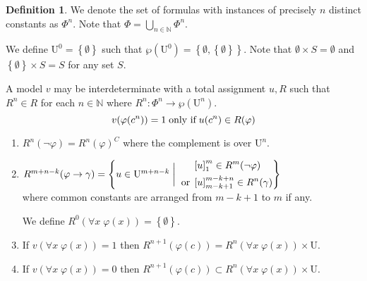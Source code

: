 \documentclass{amsbook}
\newcommand{\setsm}[1]{\left\{#1\right\}}
\newcommand{\univ}[1]{\mathord\forall#1\;}
\newcommand{\then}{\mathrel\rightarrow}
\theoremstyle{definition}
\newtheorem{dfn}{Definition}[section]
\begin{document}
\begin{dfn}
    We denote the set of formulas with instances of precisely $n$ distinct constants as $\Phi^n$. Note that $\Phi = \bigcup_{n \in \mathbb N} \Phi^n$.

    We define $\mathrm U^0 = \setsm\emptyset$ such that $\wp(\mathrm U^0) = \setsm{\emptyset, \setsm\emptyset}$. Note that $\emptyset \times S = \emptyset$ and $\setsm\emptyset \times S = S$ for any set $S$.


    A model $v$ may be interdeterminate with a total assignment $u, R$ such that $R^n \in R$ for each $n \in \mathbb N$ where $R^n: \Phi^n \longrightarrow \wp(\mathrm U^n)$.
    $$v(\varphi(c^n)) = 1 \text{\;only if\;} u(c^n) \in R(\varphi)$$
    \begin{enumerate}
        \item $R^n(\neg\varphi) = R^n(\varphi)^C$ where the complement is over $\mathrm U^n$.
        \item $R^{m+n-k}(\varphi \then \gamma) = \setsm{u \in \mathrm U^{m+n-k} \mathrel\bigg| \begin{aligned}
                           & \left[ u \right]_1^m \in R^m(\neg\varphi)        \\
                          \text{\;or\;}
                           & \left[ u \right]_{m-k+1}^{m-k+n} \in R^n(\gamma)
                      \end{aligned} }$ \\
              where common constants are arranged from $m-k+1$ to $m$ if any.

              We define $R^0(\univ x \varphi(x)) = \setsm\emptyset$.
        \item If $v(\univ x \varphi(x)) = 1$ then $R^{n+1}(\varphi(c)) = R^n(\univ x \varphi(x)) \times \mathrm U$.
        \item If $v(\univ x \varphi(x)) = 0$ then $R^{n+1}(\varphi(c)) \subset R^n(\univ x \varphi(x)) \times \mathrm U$.
    \end{enumerate}
\end{dfn}
\end{document}
